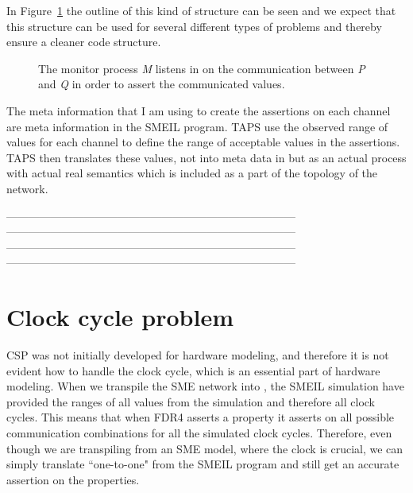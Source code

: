 In Figure~\ref{fig:assertion_process} the outline of this kind of structure can be seen and we expect that this structure can be used for several different types of problems and thereby ensure a cleaner code structure.
\begin{figure}[!ht]
  \centering
  \caption{The monitor process \textit{M} listens in on the communication between \textit{P} and \textit{Q} in order to assert the communicated values.}
  \label{fig:assertion_process}
\end{figure}

The meta information that I am using to create the assertions on each channel are meta information in the SMEIL program. TAPS use the observed range of values for each channel to define the range of acceptable values in the assertions. TAPS then translates these values, not into meta data in \cspm{} but as an actual process with actual real semantics which is included as a part of the topology of the \cspm{} network.


------------------------------------------------------------------------------\\
------------------------------------------------------------------------------\\
------------------------------------------------------------------------------\\
------------------------------------------------------------------------------\\



\section{Clock cycle problem}
% 

CSP was not initially developed for hardware modeling, and therefore it is not evident how to handle the clock cycle, which is an essential part of hardware modeling. When we transpile the SME network into \cspm{}, the SMEIL simulation have provided the ranges of all values from the simulation and therefore all clock cycles. This means that when FDR4 asserts a property it asserts on all possible communication combinations for all the simulated clock cycles. Therefore, even though we are transpiling from an SME model, where the clock is crucial, we can simply translate ``one-to-one" from the SMEIL program and still get an accurate assertion on the properties.





